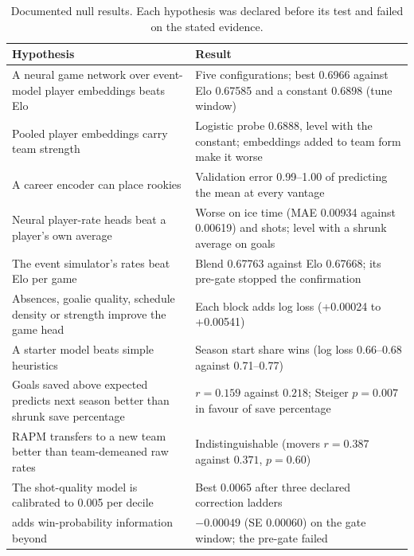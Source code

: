 \begin{table}[t]
\centering
\small
\caption{Documented null results. Each hypothesis was declared before its test
and failed on the stated evidence.}
\label{tab:nulls}
\begin{tabular}{p{}p{}}
\toprule
Hypothesis & Result \\
\midrule
A neural game network over event-model player embeddings beats Elo & Five configurations; best 0.6966 against Elo 0.67585 and a constant 0.6898 (tune window) \\
Pooled player embeddings carry team strength & Logistic probe 0.6888, level with the constant; embeddings added to team form make it worse \\
A career encoder can place rookies & Validation error 0.99--1.00 of predicting the mean at every vantage \\
Neural player-rate heads beat a player's own average & Worse on ice time (MAE 0.00934 against 0.00619) and shots; level with a shrunk average on goals \\
The event simulator's rates beat Elo per game & Blend 0.67763 against Elo 0.67668; its pre-gate stopped the confirmation \\
Absences, goalie quality, schedule density or strength improve the game head & Each block adds log loss (+0.00024 to +0.00541) \\
A starter model beats simple heuristics & Season start share wins (log loss 0.66--0.68 against 0.71--0.77) \\
Goals saved above expected predicts next season better than shrunk save percentage & $r = 0.159$ against $0.218$; Steiger $p = 0.007$ in favour of save percentage \\
RAPM transfers to a new team better than team-demeaned raw rates & Indistinguishable (movers $r = 0.387$ against $0.371$, $p = 0.60$) \\
The shot-quality model is calibrated to 0.005 per decile & Best 0.0065 after three declared correction ladders \\
\neurhlG{} adds win-probability information beyond \neurhlH{} & $-0.00049$ (SE 0.00060) on the gate window; the pre-gate failed \\
\bottomrule
\end{tabular}
\end{table}
